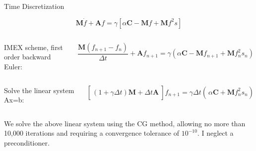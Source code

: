 \documentclass{beamer}
\begin{document}
            
            \begin{frame}{Time Discretization}
            
            \vspace{-1cm}
                
                {\Large $$\textbf{M}\dot{f} + \textbf{A}f = \gamma\left[\alpha\textbf{C} - \textbf{M}f + \textbf{M}f^2s\right]$$}
                
                 
                
                \vspace{0mm}
                
                \begin{columns}
                
                        
                        IMEX scheme, first order backward Euler:
                        
                    
                        $$ \frac{\textbf{M}(f_{n+1} - f_{n})}{\Delta t} + \textbf{A}f_{n+1} = \gamma\left(\alpha\textbf{C} - \textbf{M}f_{n+1} + \textbf{M}f_{n}^2s_{n}\right) $$

                    
                \end{columns}
                
                 
                
                \begin{columns}
                
                    
                       
                        
                        Solve the linear system Ax=b:
                        
                    
                      
                        
                        $$ \left[\frac{}{}(1+\gamma\Delta t)\textbf{M} + \Delta t \textbf{A}~\right]f_{n+1} = \gamma\Delta t\left(\frac{}{}\alpha\textbf{C} + \textbf{M}f_{n}^2s_{n}\right) $$
                    
                \end{columns}
                
                \vspace{3mm}
                
                We solve the above linear system using the CG method, allowing no more than 10,000 iterations and requiring a convergence tolerance of $10^{-10}$. I neglect a preconditioner.
                
            \end{frame}    
\end{document}
